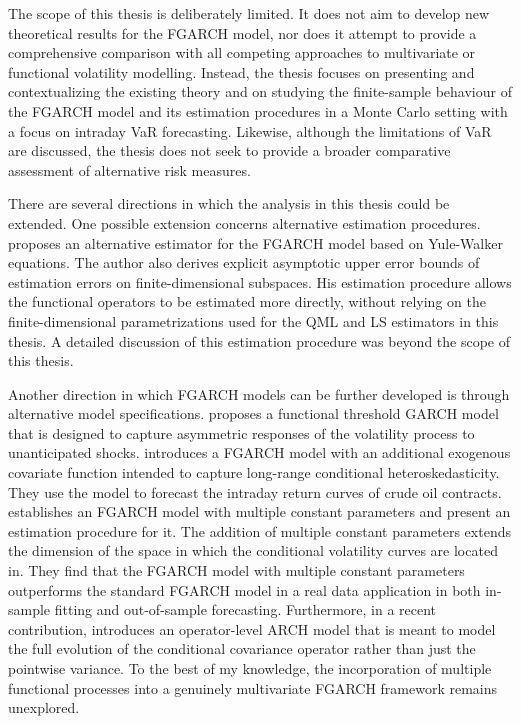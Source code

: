 \documentclass[12pt,a4paper]{article}
\theoremstyle{definition}
\begin{document}
The scope of this thesis is deliberately limited. It does not aim to develop new theoretical results for the FGARCH model, nor does it attempt to provide a comprehensive comparison with all competing approaches to multivariate or functional volatility modelling. Instead, the thesis focuses on presenting and contextualizing the existing theory and on studying the finite-sample behaviour of the FGARCH model and its estimation procedures in a Monte Carlo setting with a focus on intraday VaR forecasting. Likewise, although the limitations of VaR are discussed, the thesis does not seek to provide a broader comparative assessment of alternative risk measures.

There are several directions in which the analysis in this thesis could be extended. One possible extension concerns alternative estimation procedures. \citet{Kuehnert2020} proposes an alternative estimator for the FGARCH model based on Yule-Walker equations. The author also derives explicit asymptotic upper error bounds of estimation errors on finite-dimensional subspaces. His estimation procedure allows the functional operators to be estimated more directly, without relying on the finite-dimensional parametrizations used for the QML and LS estimators in this thesis. A detailed discussion of this estimation procedure was beyond the scope of this thesis.

Another direction in which FGARCH models can be further developed is through alternative model specifications. \cite{fTGARCH} proposes a functional threshold GARCH model that is designed to capture asymmetric responses of the volatility process to unanticipated shocks. \citet{FGARCHX} introduces a FGARCH model with an additional exogenous covariate function intended to capture long-range conditional heteroskedasticity. They use the model to forecast the intraday return curves of crude oil contracts. \citet{FGARCHmultipleconst} establishes an FGARCH model with multiple constant parameters and present an estimation procedure for it. The addition of multiple constant parameters extends the dimension of the space in which the conditional volatility curves are located in. They find that the FGARCH model with multiple constant parameters outperforms the standard FGARCH model in a real data application in both in-sample fitting and out-of-sample forecasting. Furthermore, in a recent contribution, \citet{aue2026operatorlevelarchmodel} introduces an operator-level ARCH model that is meant to model the full evolution of the conditional covariance operator rather than just the pointwise variance. To the best of my knowledge, the incorporation of multiple functional processes into a genuinely multivariate FGARCH framework remains unexplored.
\end{document}
